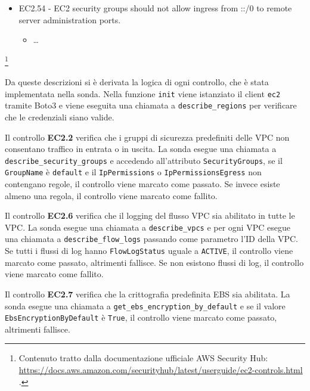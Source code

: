 \begin{mdframed}[backgroundcolor=gray!05, linecolor=gray!50]
\begin{itemize}
\begin{itemize}
        \item Security groups provide stateful filtering of ingress and egress network traffic to AWS resources. We recommend that no security group allow unrestricted ingress access to remote server administration ports, such as SSH to port 22 and RDP to port 3389, using either the TDP (6), UDP (17), or ALL (-1) protocols. Permitting public access to these ports increases resource attack surface and the risk of resource compromise.
    \end{itemize}
    \item EC2.54 - EC2 security groups should not allow ingress from ::/0 to remote server administration ports.
    \begin{itemize}
        \item \dots
    \end{itemize}
\end{itemize}
\end{mdframed}
\footnote{Contenuto tratto dalla documentazione ufficiale AWS Security Hub: \url{https://docs.aws.amazon.com/securityhub/latest/userguide/ec2-controls.html} .}

Da queste descrizioni si è derivata la logica di ogni controllo, che è stata implementata nella sonda. 
Nella funzione \texttt{init} viene istanziato il client \texttt{ec2} tramite Boto3 e viene eseguita una chiamata a \texttt{describe\_regions} per verificare che le credenziali siano valide. 

Il controllo \textbf{EC2.2} verifica che i gruppi di sicurezza predefiniti delle VPC non consentano traffico in entrata o in uscita. La sonda esegue una chiamata a \texttt{describe\_security\_groups} e accedendo all'attributo \texttt{SecurityGroups}, se il \texttt{GroupName} è \texttt{default} e il \texttt{IpPermissions} o \texttt{IpPermissionsEgress} non contengano regole, il controllo viene marcato come passato. Se invece esiste almeno una regola, il controllo viene marcato come fallito. 

Il controllo \textbf{EC2.6} verifica che il logging del flusso VPC sia abilitato in tutte le VPC. La sonda esegue una chiamata a \texttt{describe\_vpcs} e per ogni VPC esegue una chiamata a \texttt{describe\_flow\_logs} passando come parametro l'ID della VPC. Se tutti i flussi di log hanno \texttt{FlowLogStatus} uguale a \texttt{ACTIVE}, il controllo viene marcato come passato, altrimenti fallisce. Se non esistono flussi di log, il controllo viene marcato come fallito.

Il controllo \textbf{EC2.7} verifica che la crittografia predefinita EBS sia abilitata. La sonda esegue una chiamata a \texttt{get\_ebs\_encryption\_by\_default} e se il valore \texttt{EbsEncryptionByDefault} è \texttt{True}, il controllo viene marcato come passato, altrimenti fallisce.

